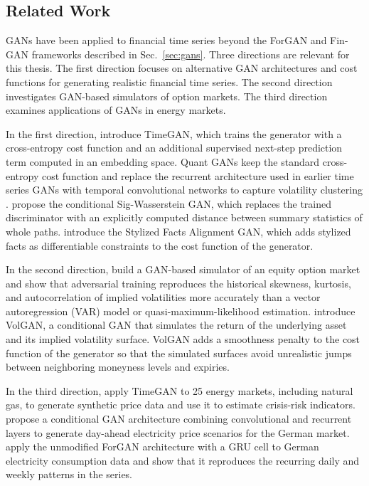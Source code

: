 \subsection{Related Work}\label{sec:relwork}

GANs have been applied to financial time series beyond the ForGAN and Fin-GAN frameworks described in Sec.~\ref{sec:gans}. Three directions are relevant for this thesis. The first direction focuses on alternative GAN architectures and cost functions for generating realistic financial time series. The second direction investigates GAN-based simulators of option markets. The third direction examines applications of GANs in energy markets.

In the first direction, \textcite{yoonTimeseriesGenerativeAdversarial} introduce TimeGAN, which trains the generator with a cross-entropy cost function and an additional supervised next-step prediction term computed in an embedding space. Quant GANs keep the standard cross-entropy cost function and replace the recurrent architecture used in earlier time series GANs with temporal convolutional networks to capture volatility clustering \parencite{wieseQuantGANsDeep2020}. \textcite{niConditionalSigWassersteinGANs2020} propose the conditional Sig-Wasserstein GAN, which replaces the trained discriminator with an explicitly computed distance between summary statistics of whole paths. \textcite{zhangVisualRealismReliable2026} introduce the Stylized Facts Alignment GAN, which adds stylized facts as differentiable constraints to the cost function of the generator. 

In the second direction, \textcite{wieseDeepHedgingLearning2019} build a GAN-based simulator of an equity option market and show that adversarial training reproduces the historical skewness, kurtosis, and autocorrelation of implied volatilities more accurately than a vector autoregression (VAR) model or quasi-maximum-likelihood estimation. \textcite{vuleticVolGANGenerativeModel2024} introduce VolGAN, a conditional GAN that simulates the return of the underlying asset and its implied volatility surface. VolGAN adds a smoothness penalty to the cost function of the generator so that the simulated surfaces avoid unrealistic jumps between neighboring moneyness levels and expiries. 

In the third direction, \textcite{bohorquezcorreaTimevaryingSystemicRisk2026} apply TimeGAN to 25 energy markets, including natural gas, to generate synthetic price data and use it to estimate crisis-risk indicators. \textcite{walterProbabilisticSimulationElectricity2024} propose a conditional GAN architecture combining convolutional and recurrent layers to generate day-ahead electricity price scenarios for the German market. \textcite{kornSimulatingIntradayElectricity2025} apply the unmodified ForGAN architecture with a GRU cell to German electricity consumption data and show that it reproduces the recurring daily and weekly patterns in the series.

